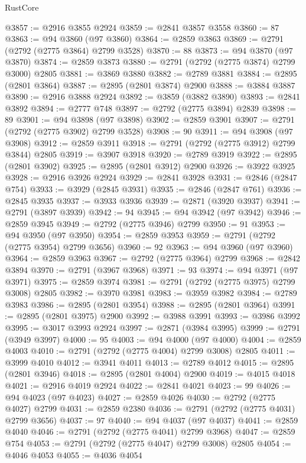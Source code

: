 \begin{lexlean}{RustCore}
\begin{coremodule}
@3857 := @2916 @3855 @2924
@3859 := @2841 @3857 @3558
@3860 := 87
@3863 := @94 @3860 (@97 @3860)
@3864 := @2859 @3863
@3869 := @2791 (@2792 (@2775 @3864) @2799 @3528)
@3870 := 88
@3873 := @94 @3870 (@97 @3870)
@3874 := @2859 @3873
@3880 := @2791 (@2792 (@2775 @3874) @2799 @3000) @2805
@3881 := @3869 @3880
@3882 := @2789 @3881
@3884 := @2895 (@2801 @3864)
@3887 := @2895 (@2801 @3874) @2900
@3888 := @3884 @3887
@3890 := @2916 @3888 @2924
@3892 := @3859 (@3882 @3890)
@3893 := @2841 @3892
@3894 := @2777 @748
@3897 := @2792 (@2775 @3894) @2839
@3898 := 89
@3901 := @94 @3898 (@97 @3898)
@3902 := @2859 @3901
@3907 := @2791 (@2792 (@2775 @3902) @2799 @3528)
@3908 := 90
@3911 := @94 @3908 (@97 @3908)
@3912 := @2859 @3911
@3918 := @2791 (@2792 (@2775 @3912) @2799 @3844) @2805
@3919 := @3907 @3918
@3920 := @2789 @3919
@3922 := @2895 (@2801 @3902)
@3925 := @2895 (@2801 @3912) @2900
@3926 := @3922 @3925
@3928 := @2916 @3926 @2924
@3929 := @2841 @3928
@3931 := @2846 (@2847 @754)
@3933 := @3929 (@2845 @3931)
@3935 := @2846 (@2847 @761)
@3936 := @2845 @3935
@3937 := @3933 @3936
@3939 := @2871 (@3920 @3937)
@3941 := @2791 (@3897 @3939)
@3942 := 94
@3945 := @94 @3942 (@97 @3942)
@3946 := @2859 @3945
@3949 := @2792 (@2775 @3946) @2799
@3950 := 91
@3953 := @94 @3950 (@97 @3950)
@3954 := @2859 @3953
@3959 := @2791 (@2792 (@2775 @3954) @2799 @3656)
@3960 := 92
@3963 := @94 @3960 (@97 @3960)
@3964 := @2859 @3963
@3967 := @2792 (@2775 @3964) @2799
@3968 := @2842 @3894
@3970 := @2791 (@3967 @3968)
@3971 := 93
@3974 := @94 @3971 (@97 @3971)
@3975 := @2859 @3974
@3981 := @2791 (@2792 (@2775 @3975) @2799 @3008) @2805
@3982 := @3970 @3981
@3983 := @3959 @3982
@3984 := @2789 @3983
@3986 := @2895 (@2801 @3954)
@3988 := @2895 (@2801 @3964)
@3991 := @2895 (@2801 @3975) @2900
@3992 := @3988 @3991
@3993 := @3986 @3992
@3995 := @3017 @3993 @2924
@3997 := @2871 (@3984 @3995)
@3999 := @2791 (@3949 @3997)
@4000 := 95
@4003 := @94 @4000 (@97 @4000)
@4004 := @2859 @4003
@4010 := @2791 (@2792 (@2775 @4004) @2799 @3008) @2805
@4011 := @3999 @4010
@4012 := @3941 @4011
@4013 := @2789 @4012
@4015 := @2895 (@2801 @3946)
@4018 := @2895 (@2801 @4004) @2900
@4019 := @4015 @4018
@4021 := @2916 @4019 @2924
@4022 := @2841 @4021
@4023 := 99
@4026 := @94 @4023 (@97 @4023)
@4027 := @2859 @4026
@4030 := @2792 (@2775 @4027) @2799
@4031 := @2859 @2380
@4036 := @2791 (@2792 (@2775 @4031) @2799 @3656)
@4037 := 97
@4040 := @94 @4037 (@97 @4037)
@4041 := @2859 @4040
@4046 := @2791 (@2792 (@2775 @4041) @2799 @3968)
@4047 := @2859 @754
@4053 := @2791 (@2792 (@2775 @4047) @2799 @3008) @2805
@4054 := @4046 @4053
@4055 := @4036 @4054

\end{coremodule}
\end{lexlean}
